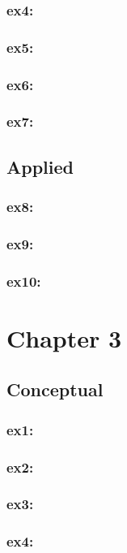 \documentclass[a4paper,12pt,titlepage]{article} %
\begin{document}
\subsubsection{ex4:}
\subsubsection{ex5:}
\subsubsection{ex6:}
\subsubsection{ex7:}

\subsection{Applied}
\subsubsection{ex8:}
\subsubsection{ex9:}
\subsubsection{ex10:}

\newpage
\section{Chapter 3}
\subsection{Conceptual}
\subsubsection{ex1:}
\subsubsection{ex2:}
\subsubsection{ex3:}
\subsubsection{ex4:}
\end{document}
